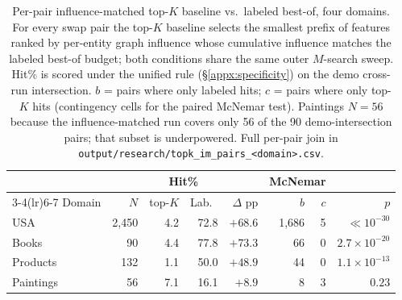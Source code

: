 \begin{table}[h]
\centering
\small
\caption{Per-pair influence-matched top-$K$ baseline vs.\ labeled best-of, four domains. For every swap pair the top-$K$ baseline selects the smallest prefix of features ranked by per-entity graph influence whose cumulative influence matches the labeled best-of budget; both conditions share the same outer $M$-search sweep. Hit\% is scored under the unified rule (\S\ref{appx:specificity}) on the demo cross-run intersection. $b$ = pairs where only labeled hits; $c$ = pairs where only top-$K$ hits (contingency cells for the paired McNemar test). Paintings $N{=}56$ because the influence-matched run covers only 56 of the 90 demo-intersection pairs; that subset is underpowered. Full per-pair join in \texttt{output/research/topk\_im\_pairs\_<domain>.csv}.}
\label{tab:topk-im}
\begin{tabular}{lrrrrrrr}
\toprule
& & \multicolumn{2}{c}{Hit\%} & & \multicolumn{2}{c}{McNemar} & \\
\cmidrule(lr){3-4}\cmidrule(lr){6-7}
Domain & $N$ & top-$K$ & Lab.\ & $\Delta$ pp & $b$ & $c$ & $p$ \\
\midrule
USA       & 2{,}450 &  4.2 & 72.8 & $+68.6$ & 1{,}686 &  5 & $\ll\!10^{-30}$ \\
Books     &      90 &  4.4 & 77.8 & $+73.3$ &      66 &  0 & $2.7\!\times\!10^{-20}$ \\
Products  &     132 &  1.1 & 50.0 & $+48.9$ &      44 &  0 & $1.1\!\times\!10^{-13}$ \\
Paintings &      56 &  7.1 & 16.1 & $+8.9$  &       8 &  3 & $0.23$ \\
\bottomrule
\end{tabular}
\end{table}
